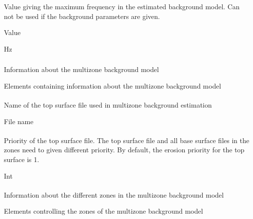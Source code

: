 \subsubsection{}
 \slist
   \item \Description Value giving the maximum frequency in the estimated background model. Can not be used if the background parameters are given.
   \item \Argument Value
   \item {} Hz
 \elist

\subsubsection{}
 \slist
   \item \Description  Information about the multizone background model
   \item \Argument Elements containing information about the multizone background model
   \item \Default
 \elist

\paragraph{}
 \slist
   \item \Description Name of the top surface file used in multizone background estimation
   \item \Argument File name
   \item \Default
 \elist

\paragraph{}
 \slist
   \item \Description Priority of the top surface file. The top surface file and all base surface files in the zones need to given different priority. By default, the erosion priority for the top surface is 1.
   \item \Argument Int
   \item {}
 \elist

\paragraph{}
 \slist
   \item \Description Information about the different zones in the multizone background model
   \item \Argument Elements controlling the zones of the multizone background model
   \item \Default
 \elist

